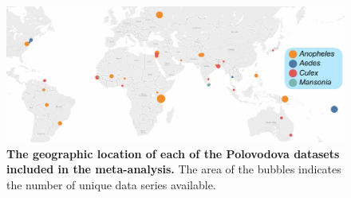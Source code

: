 \documentclass[12pt]{article}
\begin{document}
{\begin{figure}[ht]
	\centerline{\includegraphics[width=1.25\textwidth]{./Figure_files/dissection_map.pdf}}
	\caption{\textbf{The geographic location of each of the Polovodova datasets included in the meta-analysis.} The area of the bubbles indicates the number of unique data series available.}\label{fig:dissection_map}
\end{figure}

}
\end{document}
